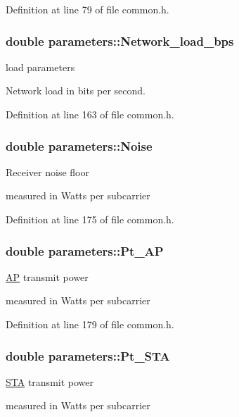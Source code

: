 Definition at line 79 of file common.\-h.

\hypertarget{structparameters_ab7a40818f657353275b8049574bf3b0d}{
\subsubsection[{Network\-\_\-load\-\_\-bps}]{\setlength{\rightskip}{0pt plus 5cm}double parameters\-::\-Network\-\_\-load\-\_\-bps}}\label{structparameters_ab7a40818f657353275b8049574bf3b0d}
load parameters \par
Network load in bits per second. \par


Definition at line 163 of file common.\-h.

\hypertarget{structparameters_a6cf4f2d340c4d03c138cee3460f047eb}{
\subsubsection[{Noise}]{\setlength{\rightskip}{0pt plus 5cm}double parameters\-::\-Noise}}\label{structparameters_a6cf4f2d340c4d03c138cee3460f047eb}
Receiver noise floor \par
measured in Watts per subcarrier \par


Definition at line 175 of file common.\-h.

\hypertarget{structparameters_a4af7a6d10fd1012d16cba5f7b13c930b}{
\subsubsection[{Pt\-\_\-\-A\-P}]{\setlength{\rightskip}{0pt plus 5cm}double parameters\-::\-Pt\-\_\-\-A\-P}}\label{structparameters_a4af7a6d10fd1012d16cba5f7b13c930b}
\hyperlink{classAP}{A\-P} transmit power \par
measured in Watts per subcarrier \par


Definition at line 179 of file common.\-h.

\hypertarget{structparameters_a52242f438292fd65f607c8789631d10d}{
\subsubsection[{Pt\-\_\-\-S\-T\-A}]{\setlength{\rightskip}{0pt plus 5cm}double parameters\-::\-Pt\-\_\-\-S\-T\-A}}\label{structparameters_a52242f438292fd65f607c8789631d10d}
\hyperlink{classSTA}{S\-T\-A} transmit power \par
measured in Watts per subcarrier \par


